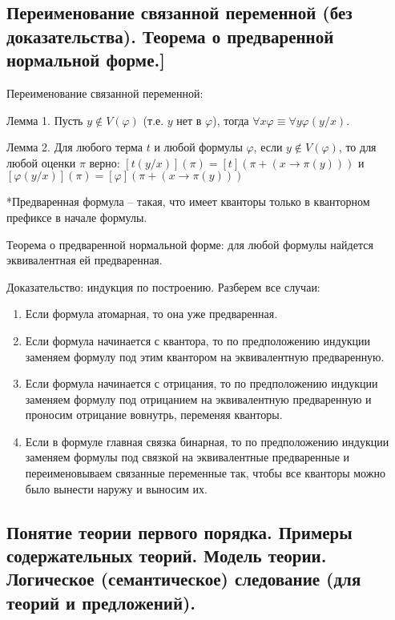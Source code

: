 \documentclass[a4paper, 10pt]{article}
\begin{document}
\subsection{Переименование связанной переменной (без доказательства). Теорема о предваренной нормальной форме.]}

Переименование связанной переменной:

Лемма 1. Пусть $y\not\in V(\varphi)$ (т.е. $y$ нет в $\varphi$), тогда $\forall x\varphi \equiv \forall y\varphi(y/x)$.

Лемма 2. Для любого терма $t$ и любой формулы $\varphi$, если $y \not\in V(\varphi)$, то для любой оценки $\pi$ верно: $[t(y/x)](\pi)=[t](\pi + (x \to \pi(y)))$ и $[\varphi(y/x)](\pi)=[\varphi](\pi + (x \to \pi(y)))$

\hfill

*Предваренная формула -- такая, что имеет кванторы только в кванторном префиксе в начале формулы.

Теорема о предваренной нормальной форме: для любой формулы найдется эквивалентная ей предваренная.

Доказательство: индукция по построению. Разберем все случаи:

\begin{enumerate}
    \item Если формула атомарная, то она уже предваренная.
    \item Если формула начинается с квантора, то по предположению индукции заменяем формулу под этим квантором на эквивалентную предваренную.
    \item Если формула начинается с отрицания, то по предположению индукции заменяем формулу под отрицанием на эквивалентную предваренную и проносим отрицание вовнутрь, переменяя кванторы.
    \item Если в формуле главная связка бинарная, то по предположению индукции заменяем формулы под связкой на эквивалентные предваренные и переименовываем связанные переменные так, чтобы все кванторы можно было вынести наружу и выносим их.
\end{enumerate}

\subsection{Понятие теории первого порядка. Примеры содержательных теорий. Модель теории. Логическое (семантическое) следование (для теорий и предложений).}
\end{document}
